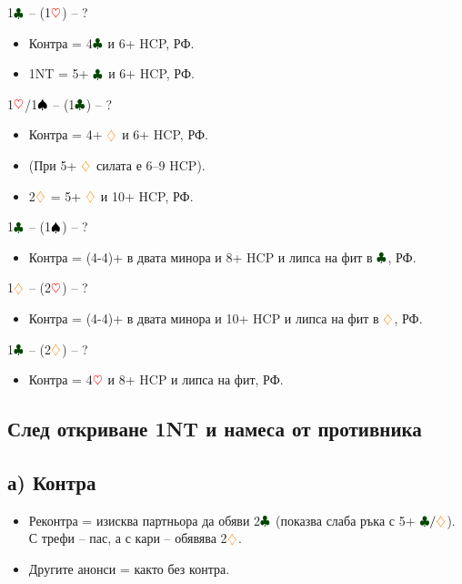 \documentclass[10pt,a5paper]{extarticle}
\newcommand{\Rheart}{\textcolor{red}{\heartsuit}}
\newcommand{\Rdiamond}{\textcolor{orange}{\diamondsuit}}
\newcommand{\Bspade}{\textcolor{black}{\spadesuit}}
\newcommand{\Bclub}{\textcolor{darkgreen}{\clubsuit}}
\begin{document}
1$\Bclub$ -- (1$\Rheart$) -- ?  
\begin{itemize}
    \item Контра = 4$\Bclub$ и 6+ HCP, РФ.  
    \item 1NT = 5+ $\Bclub$ и 6+ HCP, РФ.
\end{itemize}

1$\Rheart$/1$\Bspade$ -- (1$\Bclub$) -- ?  
\begin{itemize}
    \item Контра = 4+ $\Rdiamond$ и 6+ HCP, РФ.  
    \item (При 5+ $\Rdiamond$ силата е 6--9 HCP).  
    \item 2$\Rdiamond$ = 5+ $\Rdiamond$ и 10+ HCP, РФ.
\end{itemize}

1$\Bclub$ -- (1$\Bspade$) -- ?  
\begin{itemize}
    \item Контра = (4-4)+ в двата минора и 8+ HCP и липса на фит в $\Bclub$, РФ.
\end{itemize}

1$\Rdiamond$ -- (2$\Rheart$) -- ?  
\begin{itemize}
    \item Контра = (4-4)+ в двата минора и 10+ HCP и липса на фит в $\Rdiamond$, РФ.
\end{itemize}

1$\Bclub$ -- (2$\Rdiamond$) -- ?  
\begin{itemize}
    \item Контра = 4$\Rheart$ и 8+ HCP и липса на фит, РФ.
\end{itemize}

\subsection*{След откриване 1NT и намеса от противника}

\subsection*{а) Контра}
\begin{itemize}
    \item Реконтра = изисква партньора да обяви 2$\Bclub$ (показва слаба ръка с 5+ $\Bclub/\Rdiamond$).  
        \quad С трефи -- пас, а с кари -- обявява 2$\Rdiamond$.
    \item Другите анонси = както без контра.
\end{itemize}
\end{document}
